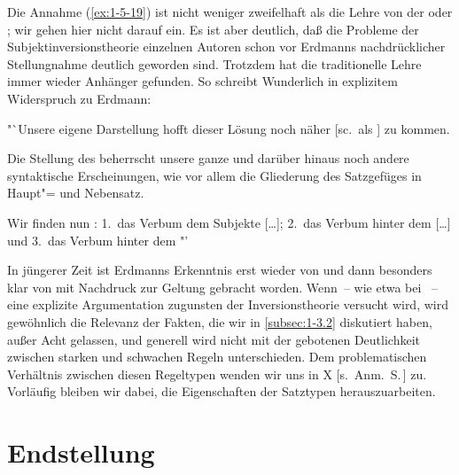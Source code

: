 \documentclass[output=paper]{langsci/langscibook}
\begin{document}
\addlines%
Die Annahme (\ref{ex:1-5-19}) ist nicht weniger zweifelhaft als die Lehre von der 
oder ; wir gehen hier nicht darauf ein. Es ist aber deutlich, daß die
Probleme der Subjektinversionstheorie einzelnen Autoren schon vor Erdmanns
nachdrücklicher Stellungnahme deutlich geworden sind. Trotzdem hat die traditionelle Lehre immer wieder Anhänger gefunden. So schreibt \zb Wunderlich in explizitem Widerspruch zu Erdmann:
\begin{exe}
\ex\label{ex:1-5-21}

"`Unsere eigene Darstellung hofft dieser Lösung noch näher [sc.\ als \citealt{Erdmann1886}] zu kommen.

Die Stellung des  beherrscht unsere ganze
 und darüber hinaus noch andere syntaktische Erscheinungen,
wie vor allem die Gliederung des Satzgefüges in Haupt"= und Nebensatz.

Wir finden nun : 1.\ das Verbum
 dem Subjekte [\ldots]; 2.\ das Verbum  hinter dem 
[\ldots] und 3.\ das Verbum  hinter dem "' \citep[87f]{Wunderlich1892}
\end{exe}
In jüngerer Zeit ist Erdmanns Erkenntnis erst wieder von \citet{Drach1937} und dann
besonders klar von \citet{Griesbach1960a,Griesbach1961a} mit Nachdruck zur Geltung gebracht worden. Wenn~-- wie etwa bei \citet{Bluemel1914}~-- eine explizite Argumentation zugunsten
der Inversionstheorie versucht wird, wird gewöhnlich die Relevanz der Fakten, die
wir in \ref{subsec:1-3.2} diskutiert haben, außer Acht gelassen, und generell wird nicht mit der gebotenen Deutlichkeit zwischen starken und schwachen Regeln unterschieden. Dem
problematischen Verhältnis zwischen diesen Regeltypen wenden wir uns in X [s.\ Anm.\ S.\,\pageref{fn-herausgeber-topo}]\label{X:7} zu. Vorläufig bleiben wir dabei, die  Eigenschaften der Satztypen herauszuarbeiten.


\section{Endstellung}%
\label{sec:1-6}
\end{document}
